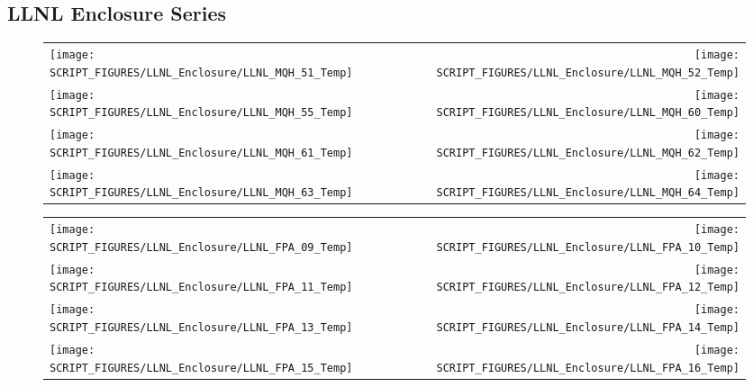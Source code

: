 \clearpage

\subsection{LLNL Enclosure Series}

\begin{figure}[p]
\begin{tabular*}{\textwidth}{l@{\extracolsep{\fill}}r}
\texttt{[image: SCRIPT\_FIGURES/LLNL\_Enclosure/LLNL\_MQH\_51\_Temp]} &
\texttt{[image: SCRIPT\_FIGURES/LLNL\_Enclosure/LLNL\_MQH\_52\_Temp]} \\
\texttt{[image: SCRIPT\_FIGURES/LLNL\_Enclosure/LLNL\_MQH\_55\_Temp]} &
\texttt{[image: SCRIPT\_FIGURES/LLNL\_Enclosure/LLNL\_MQH\_60\_Temp]} \\
\texttt{[image: SCRIPT\_FIGURES/LLNL\_Enclosure/LLNL\_MQH\_61\_Temp]} &
\texttt{[image: SCRIPT\_FIGURES/LLNL\_Enclosure/LLNL\_MQH\_62\_Temp]} \\
\texttt{[image: SCRIPT\_FIGURES/LLNL\_Enclosure/LLNL\_MQH\_63\_Temp]} &
\texttt{[image: SCRIPT\_FIGURES/LLNL\_Enclosure/LLNL\_MQH\_64\_Temp]}
\end{tabular*}
\end{figure}

\begin{figure}[p]
\begin{tabular*}{\textwidth}{l@{\extracolsep{\fill}}r}
\texttt{[image: SCRIPT\_FIGURES/LLNL\_Enclosure/LLNL\_FPA\_09\_Temp]} &
\texttt{[image: SCRIPT\_FIGURES/LLNL\_Enclosure/LLNL\_FPA\_10\_Temp]} \\
\texttt{[image: SCRIPT\_FIGURES/LLNL\_Enclosure/LLNL\_FPA\_11\_Temp]} &
\texttt{[image: SCRIPT\_FIGURES/LLNL\_Enclosure/LLNL\_FPA\_12\_Temp]} \\
\texttt{[image: SCRIPT\_FIGURES/LLNL\_Enclosure/LLNL\_FPA\_13\_Temp]} &
\texttt{[image: SCRIPT\_FIGURES/LLNL\_Enclosure/LLNL\_FPA\_14\_Temp]} \\
\texttt{[image: SCRIPT\_FIGURES/LLNL\_Enclosure/LLNL\_FPA\_15\_Temp]} &
\texttt{[image: SCRIPT\_FIGURES/LLNL\_Enclosure/LLNL\_FPA\_16\_Temp]}
\end{tabular*}
\end{figure}

